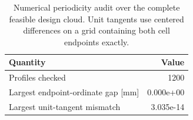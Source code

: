 \begin{table}[t]
\centering\small
\caption{Numerical periodicity audit over the complete feasible design cloud. Unit tangents use centered differences on a grid containing both cell endpoints exactly.}
\label{tab:periodicity_audit}
\begin{tabular}{lr}
\toprule
Quantity & Value \\
\midrule
Profiles checked & 1200 \\
Largest endpoint-ordinate gap [mm] & 0.000e+00 \\
Largest unit-tangent mismatch & 3.035e-14 \\
\bottomrule
\end{tabular}
\end{table}
